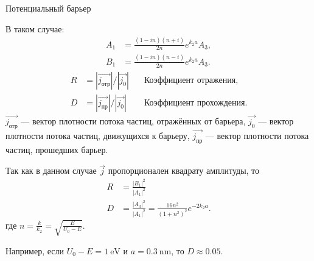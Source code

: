\documentclass[a4paper,12pt]{article}
\begin{document}
\begin{problem}{Потенциальный барьер}
\begin{solution}
  В таком случае:
  \begin{align*}
    A_{1} &= \frac{(1 - i n) (n + i)}{2 n} e^{k_{2} a} A_{3}, \\
    B_{1} &= \frac{(1 - i n) (n - i)}{2 n} e^{k_{2} a} A_{3}.
  \end{align*}
  \begin{align*}
    R &= \left|\vec{j_{\text{отр}}}\right| / \left|\vec{j_{0}}\right| & \quad \text{Коэффициент отражения}, \\
    D &= \left|\vec{j_{\text{пр}}}\right| / \left|\vec{j_{0}}\right| & \quad \text{Коэффициент прохождения}.
  \end{align*}
  \(\vec{j_{\text{отр}}}\) --- вектор плотности потока частиц, отражённых от барьера,
  \(\vec{j_{0}}\) --- вектор плотности потока частиц, движущихся к барьеру,
  \(\vec{j_{\text{пр}}}\) --- вектор плотности потока частиц, прошедших барьер.

  Так как в данном случае \(\vec{j}\) пропорционален квадрату амплитуды, то
  \begin{align*}
    R &= \frac{|B_{1}|^{2}}{|A_{1}|^{2}} \\
    D &= \frac{|A_{3}|^{2}}{|A_{1}|^{2}} = \frac{16 n^{2}}{{(1 + n^{2})}^{2}} e^{-2 k_{2} a}.
  \end{align*}
  где \(n = \frac{k}{k_{2}} = \sqrt{\frac{E}{U_{0} - E}}\).

  Например, если \(U_{0} - E = \qty{1}{\eV}\) и \(a = \qty{0.3}{\nano\metre}\), то \(D \approx \num{0.05}\).
\end{solution}
\end{problem}
\end{document}

